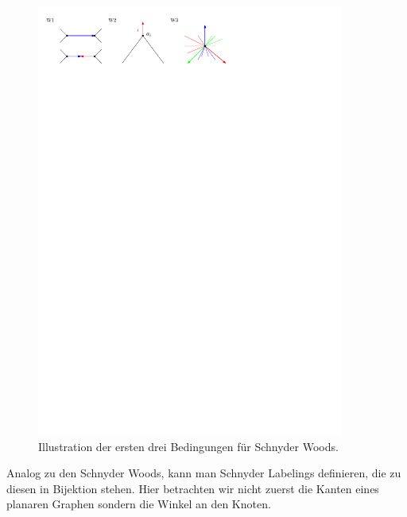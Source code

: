 \begin{figure}[h]
	\centering
  \includegraphics[width=0.9\textwidth]{schnyder_wood_def.pdf}
  \caption{Illustration der ersten drei Bedingungen für Schnyder Woods.}
\end{figure}

Analog zu den Schnyder Woods, kann man Schnyder Labelings definieren, die zu diesen in Bijektion stehen. Hier betrachten wir nicht zuerst die Kanten eines planaren Graphen sondern die Winkel an den Knoten.

